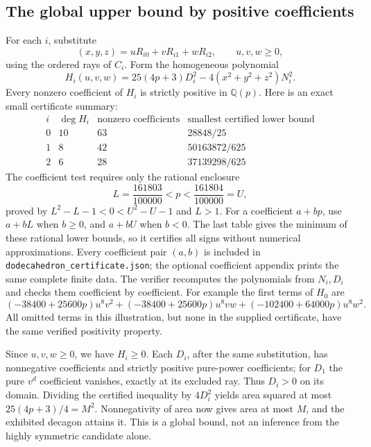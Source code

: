 \subsection{The global upper bound by positive coefficients}
For each $i$, substitute
\[
 (x,y,z)=uR_{i0}+vR_{i1}+wR_{i2},\qquad u,v,w\ge0,
\]
using the ordered rays of $C_i$.  Form the homogeneous polynomial
\[
 H_i(u,v,w)=25(4p+3)D_i^2
       -4(x^2+y^2+z^2)N_i^2.
\]
Every nonzero coefficient of $H_i$ is strictly positive in $\mathbb Q(p)$.
Here is an exact small certificate summary:
\[
\begin{array}{c|c|c|c}
 i&\deg H_i&\text{nonzero coefficients}&\text{smallest certified lower bound}\\\hline
 0&10&63&28848/25\\
 1&8&42&50163872/625\\
 2&6&28&37139298/625
\end{array}
\]
The coefficient test requires only the rational enclosure
\[
 L=\frac{161803}{100000}<p<\frac{161804}{100000}=U,
\]
proved by $L^2-L-1<0<U^2-U-1$ and $L>1$.  For a coefficient $a+bp$, use
$a+bL$ when $b\ge0$, and $a+bU$ when $b<0$.  The last table gives the
minimum of these rational lower bounds, so it certifies all signs without
numerical approximations.  Every coefficient pair $(a,b)$ is included in
\texttt{dodecahedron\_certificate.json}; the optional coefficient appendix
prints the same complete finite data.  The verifier recomputes the
polynomials from $N_i,D_i$ and checks them coefficient by coefficient.
For example the first terms of $H_0$ are
\[
 (-38400+25600p)u^8v^2+
 (-38400+25600p)u^8vw+
 (-102400+64000p)u^8w^2.
\]
All omitted terms in this illustration, but none in the supplied certificate,
have the same verified positivity property.

Since $u,v,w\ge0$, we have $H_i\ge0$.  Each $D_i$, after the same substitution,
has nonnegative coefficients and strictly positive pure-power coefficients;
for $D_1$ the pure $v^d$ coefficient vanishes, exactly at its excluded ray.
Thus $D_i>0$ on its domain.  Dividing the certified inequality by $4D_i^2$
yields area squared at most $25(4p+3)/4=M^2$.  Nonnegativity of area now gives
area at most $M$, and the exhibited decagon attains it.  This is a global
bound, not an inference from the highly symmetric candidate alone.


